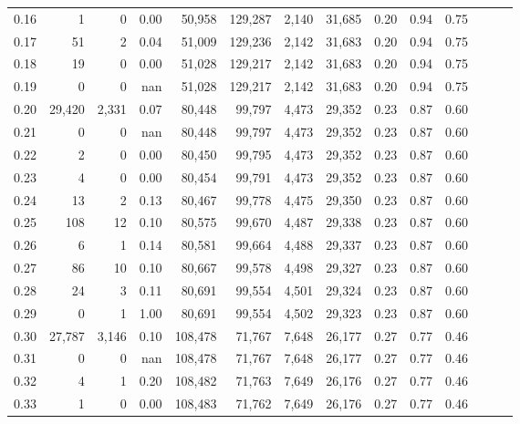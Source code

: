 \begin{tabular}{rrrrrrrrrrrrrr}
0.16 &       1 &      0 &  0.00 &   50,958 &  129,287 &   2,140 &  31,685 &  0.20 &  0.94 &      0.75 \\
0.17 &      51 &      2 &  0.04 &   51,009 &  129,236 &   2,142 &  31,683 &  0.20 &  0.94 &      0.75 \\
0.18 &      19 &      0 &  0.00 &   51,028 &  129,217 &   2,142 &  31,683 &  0.20 &  0.94 &      0.75 \\
0.19 &       0 &      0 &   nan &   51,028 &  129,217 &   2,142 &  31,683 &  0.20 &  0.94 &      0.75 \\
0.20 &  29,420 &  2,331 &  0.07 &   80,448 &   99,797 &   4,473 &  29,352 &  0.23 &  0.87 &      0.60 \\
0.21 &       0 &      0 &   nan &   80,448 &   99,797 &   4,473 &  29,352 &  0.23 &  0.87 &      0.60 \\
0.22 &       2 &      0 &  0.00 &   80,450 &   99,795 &   4,473 &  29,352 &  0.23 &  0.87 &      0.60 \\
0.23 &       4 &      0 &  0.00 &   80,454 &   99,791 &   4,473 &  29,352 &  0.23 &  0.87 &      0.60 \\
0.24 &      13 &      2 &  0.13 &   80,467 &   99,778 &   4,475 &  29,350 &  0.23 &  0.87 &      0.60 \\
0.25 &     108 &     12 &  0.10 &   80,575 &   99,670 &   4,487 &  29,338 &  0.23 &  0.87 &      0.60 \\
0.26 &       6 &      1 &  0.14 &   80,581 &   99,664 &   4,488 &  29,337 &  0.23 &  0.87 &      0.60 \\
0.27 &      86 &     10 &  0.10 &   80,667 &   99,578 &   4,498 &  29,327 &  0.23 &  0.87 &      0.60 \\
0.28 &      24 &      3 &  0.11 &   80,691 &   99,554 &   4,501 &  29,324 &  0.23 &  0.87 &      0.60 \\
0.29 &       0 &      1 &  1.00 &   80,691 &   99,554 &   4,502 &  29,323 &  0.23 &  0.87 &      0.60 \\
0.30 &  27,787 &  3,146 &  0.10 &  108,478 &   71,767 &   7,648 &  26,177 &  0.27 &  0.77 &      0.46 \\
0.31 &       0 &      0 &   nan &  108,478 &   71,767 &   7,648 &  26,177 &  0.27 &  0.77 &      0.46 \\
0.32 &       4 &      1 &  0.20 &  108,482 &   71,763 &   7,649 &  26,176 &  0.27 &  0.77 &      0.46 \\
0.33 &       1 &      0 &  0.00 &  108,483 &   71,762 &   7,649 &  26,176 &  0.27 &  0.77 &      0.46 \\

\end{tabular}
